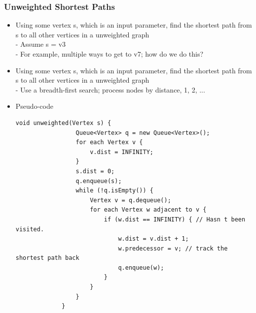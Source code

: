 \documentclass[10pt]{article}
\begin{document}
\subsubsection{Unweighted Shortest Paths}
\begin{itemize}
    \item  Using some vertex s, which is an input parameter, find the shortest path from s to all other vertices in a unweighted graph \\
          - Assume s = v3 \\
          - For example, multiple ways to get to v7; how do we do this?
    \item Using some vertex s, which is an input parameter, find the shortest path from s to all other vertices in a unweighted graph \\- Use a breadth-first search; process nodes by distance, 1, 2, ...
    \item Pseudo-code
          \begin{lstlisting}[style=java]
             void unweighted(Vertex s) {
                 Queue<Vertex> q = new Queue<Vertex>();
                 for each Vertex v {
                     v.dist = INFINITY;
                 }
                 s.dist = 0;
                 q.enqueue(s);
                 while (!q.isEmpty()) {
                     Vertex v = q.dequeue();
                     for each Vertex w adjacent to v {
                         if (w.dist == INFINITY) { // Hasn t been visited.
                             w.dist = v.dist + 1;
                             w.predecessor = v; // track the shortest path back
                             q.enqueue(w);
                         }
                     }
                 }
             }
         \end{lstlisting}
\end{itemize}
\end{document}
